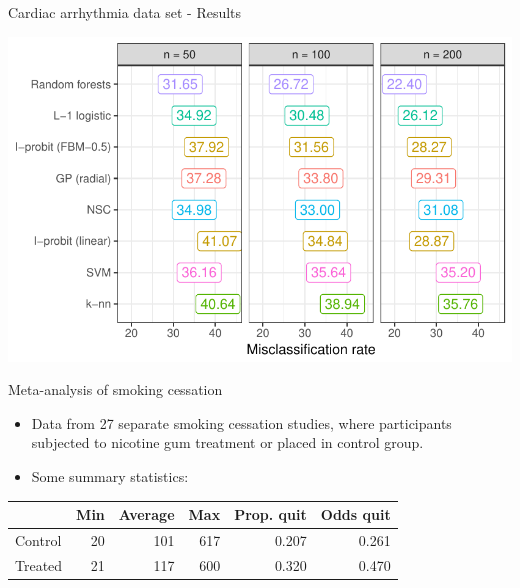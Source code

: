 \documentclass{beamer}\usepackage[]{graphicx}\usepackage[]{color}
\makeatletter
\def\maxwidth{ %
  \ifdim\Gin@nat@width>\linewidth
    \linewidth
  \else
    \Gin@nat@width
  \fi
}
\newenvironment{knitrout}{}{} %
\makeatother
\begin{document}
\begin{frame}[fragile]{Cardiac arrhythmia data set - Results}
\begin{knitrout}\small
{}\color{fgcolor}

{\centering \includegraphics[width=\maxwidth]{figure/unnamed-chunk-6-1} 

}



\end{knitrout}
\end{frame}

\begin{frame}[fragile]{Meta-analysis of smoking cessation}
  \begin{itemize}
    \item Data from 27 separate smoking cessation studies, where participants subjected to nicotine gum treatment or placed in control group.
    \item Some summary statistics:
  \end{itemize}

\begin{center}

\begin{tabular}{l|r|r|r|r|r}
\hline
  & Min & Average & Max & Prop. quit & Odds quit\\
\hline
Control & 20 & 101 & 617 & 0.207 & 0.261\\
\hline
Treated & 21 & 117 & 600 & 0.320 & 0.470\\
\hline
\end{tabular}


\end{center}
\end{frame}
\end{document}
